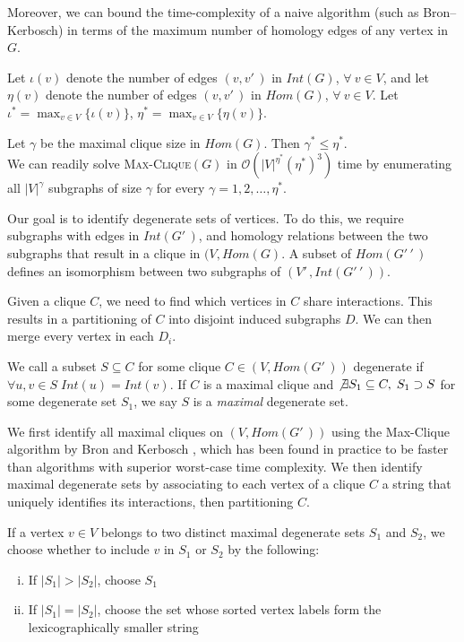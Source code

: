 \documentclass[12pt,twoside]{article}
\def\NI{\noindent}
\begin{document}
\NI Moreover, we can bound the time-complexity of a naive algorithm (such as Bron--Kerbosch) in terms of the maximum number of homology edges of any vertex in $G$.

\NI Let $\iota(v)$ denote the number of edges $(v, v'\,\!)$ in $Int(G)$, $\forall \: v \in V$, and let $\eta(v)$ denote the number of edges $(v, v'\,\!)$ in $Hom(G)$, $\forall \: v \in V$. Let $\iota^* = \displaystyle \max_{v \in V}\{\iota(v)\}$, $\eta^* = \displaystyle \max_{v \in V}\{\eta(v)\}$.

\NI Let $\gamma$ be the maximal clique size in $Hom(G)$. Then $\gamma^* \leq \eta^*$.\\
\NI We can readily solve \textsc{Max-Clique}$(G)$ in $\mathcal O(|V|^{\eta^*}(\eta^*)^3)$ time by enumerating all $|V|^{\gamma}$ subgraphs of size $\gamma$ for every $\gamma = 1, 2, \ldots, \eta^*$.

\NI Our goal is to identify degenerate sets of vertices. To do this, we require subgraphs with edges in $Int(G'\,\!)$, and homology relations between the two subgraphs that result in a clique in $(V,Hom(G)$. A subset of $Hom(G'\,\!'\,\!)$ defines an isomorphism between two subgraphs of $(V'\,\!, Int(G'\,\!'\,\!))$.

\NI Given a clique $C$, we need to find which vertices in $C$ share interactions. This results in a partitioning of $C$ into disjoint induced subgraphs $D$. We can then merge every vertex in each $D_i$.

\NI We call a subset $S \subseteq C$ for some clique $C \in (V,Hom(G'\,\!))$ degenerate if $\forall u,v \in S \; Int(u) = Int(v)$. If $C$ is a maximal clique and $\not \exists S_1 \subseteq C, \; S_1 \supset S$ for some degenerate set $S_1$, we say $S$ is a \emph{maximal} degenerate set.

\NI We first identify all maximal cliques on $(V,Hom(G'\,\!))$ using the {Max-Clique} algorithm by Bron and Kerbosch \cite{bron}, which has been found in practice to be faster than algorithms with superior worst-case time complexity. We then identify maximal degenerate sets by associating to each vertex of a clique $C$ a string that uniquely identifies its interactions, then partitioning $C$.

\NI If a vertex $v \in V$ belongs to two distinct maximal degenerate sets $S_1$ and $S_2$, we choose whether to include $v$ in $S_1$ or $S_2$ by the following:
\vspace{-1.5em} \begin{enumerate}[i)]
\item If $|S_1| > |S_2|$, choose $S_1$
\vspace{-1.5em} \item If $|S_1| = |S_2|$, choose the set whose sorted vertex labels form the lexicographically smaller string
\vspace{-1.5em}\end{enumerate}
\end{document}
